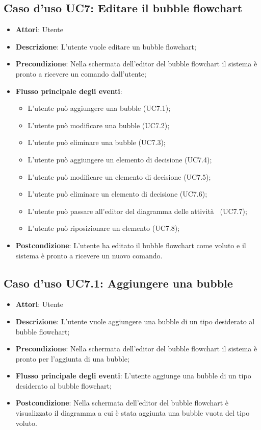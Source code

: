 \documentclass[../AnalisiDeiRequisiti.tex]{subfiles}
\begin{document}
				\subsection{Caso d'uso UC7: Editare il bubble flowchart}
				\begin{itemize}
					\item \textbf{Attori}: Utente
					\item \textbf{Descrizione}: L'utente vuole editare un bubble flowchart;
					\item \textbf{Precondizione}: Nella schermata dell'editor del bubble flowchart il sistema è pronto a ricevere un comando dall'utente;
					\item \textbf{Flusso principale degli eventi}: \begin{itemize}
						\item L'utente può aggiungere una bubble (UC7.1);
						\item L'utente può modificare una bubble (UC7.2);
						\item L'utente può eliminare una bubble (UC7.3);
						\item L'utente può aggiungere un elemento di decisione (UC7.4);
						\item L'utente può modificare un elemento di decisione (UC7.5);
						\item L'utente può eliminare un elemento di decisione (UC7.6);
						\item L'utente può passare all'editor del diagramma delle attività  (UC7.7);
						\item L'utente può riposizionare un elemento (UC7.8);
					\end{itemize}
					\item \textbf{Postcondizione}: L'utente ha editato il bubble flowchart come voluto e il sistema è pronto a ricevere un nuovo comando.
				\end{itemize}
				\subsection{Caso d'uso UC7.1: Aggiungere una bubble}
				\begin{itemize}
					\item \textbf{Attori}: Utente
					\item \textbf{Descrizione}: L'utente vuole aggiungere una bubble di un tipo desiderato al bubble flowchart;
					\item \textbf{Precondizione}: Nella schermata dell'editor del bubble flowchart il sistema è pronto per l'aggiunta di una bubble;
					\item \textbf{Flusso principale degli eventi}: L'utente aggiunge una bubble di un tipo desiderato al bubble flowchart;
					\item \textbf{Postcondizione}: Nella schermata dell'editor del bubble flowchart è visualizzato il diagramma a cui è stata aggiunta una bubble vuota del tipo voluto.
				\end{itemize}
\end{document}
